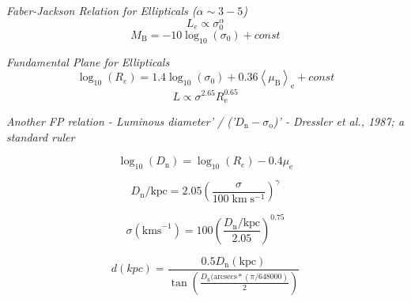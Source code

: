 \documentclass{spy}
\begin{document}
\textit {Faber-Jackson Relation for Ellipticals (\(\alpha \sim 3-5\))}
\begin{equation}
L_e \propto \sigma^\alpha_\mathrm{0}
\end{equation}
\begin{equation}
M_\mathrm{B} = - 10 \log_\mathrm{10}(\sigma_\mathrm{0}) + const
\end{equation}

\textit {Fundamental Plane for Ellipticals}
\begin{equation} \label{FP}
\log_\mathrm{10}(R_e) = 1.4 \log_\mathrm{10}(\sigma_\mathrm{0}) + 0.36 \left<\mu_\mathrm{B}\right>_\mathrm{e} + const
\end{equation}
\begin{equation} 
L \propto \sigma^{2.65} R_\mathrm{e}^{0.65}
\end{equation}

\textit{Another FP relation - Luminous diameter' / ('\(D_\mathrm{n}-\sigma_\mathrm{o}\))' - Dressler et al., 1987; a standard ruler}

\begin{equation} \label{Dn}
\log_\mathrm{10}(D_\mathrm{n}) = \log_\mathrm{10}(R_e) - 0.4\mu_\mathrm{e}
\end{equation}


\begin{equation}
D_\mathrm{n}/ \mathrm{kpc} = 2.05 \left(\frac{\sigma}{100 \; \mathrm{km \; s^{-1}}}\right)^\gamma
\end{equation}
\begin{center}
\end{center}

\begin{equation}
\sigma (\mathrm{km s}^{-1}) = 100 \left( \frac{D_\mathrm{n} / \mathrm{kpc}}{2.05} \right)^{0.75}
\end{equation}



\begin{equation}
d (kpc)= \frac{0.5 D_\mathrm{n}(\mathrm{kpc})}{\tan\left( \frac{D_\mathrm{n}(\mathrm{arcsecs} * (\pi / 648000)}{2} \right)}
\end{equation}
\end{document}
